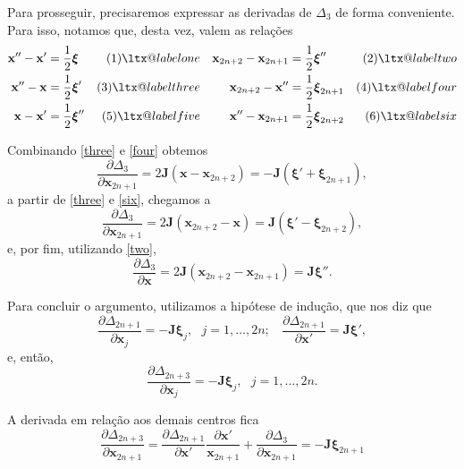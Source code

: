 \documentclass[
	12pt,
	oneside,			%
	a4paper,			%
	english,			%
	brazil				%
	]{abntex2}
\makeatletter
\theoremstyle{definition}
\newcommand\Label[1]{&\refstepcounter{equation}(\theequation)\ltx@label{#1}&}
\makeatother
\begin{document}
\begin{apendicesenv}
Para prosseguir, precisaremos expressar as derivadas de $\Delta_3$ de forma conveniente. Para isso, notamos que, desta vez, valem as relações
\begin{align*}
     \mathbf{x}'' - \mathbf{x}' &= \frac{1}{2}\boldsymbol{\xi} \Label{one}& \mathbf{x}_{2n+2} - \mathbf{x}_{2n+1} &= \frac{1}{2}\boldsymbol{\xi}'' \Label{two}\\
     \mathbf{x}'' - \mathbf{x} &= \frac{1}{2}\boldsymbol{\xi}' \Label{three}& \mathbf{x}_{2n+2} - \mathbf{x}'' &= \frac{1}{2}\boldsymbol{\xi}_{2n+1} \Label{four} \\
     \mathbf{x} - \mathbf{x}' &= \frac{1}{2}\boldsymbol{\xi}'' \Label{five}& \mathbf{x}'' - \mathbf{x}_{2n+1} &= \frac{1}{2}\boldsymbol{\xi}_{2n+2} \Label{six}
\end{align*}

Combinando \eqref{three} e \eqref{four} obtemos
\begin{equation}
    \frac{\partial \Delta_3}{\partial \mathbf{x}_{2n+1}} = 2\mathbf{J}\left(\mathbf{x}-\mathbf{x}_{2n+2}\right) = - \mathbf{J}\left( \boldsymbol{\xi}' + \boldsymbol{\xi}_{2n+1} \right),
\end{equation}
a partir de \eqref{three} e \eqref{six}, chegamos a
\begin{equation}
    \frac{\partial \Delta_3}{\partial \mathbf{x}_{2n+1}} = 2 \mathbf{J} \left(\mathbf{x}_{2n+2}-\mathbf{x}\right) = \mathbf{J}\left( \boldsymbol{\xi}' - \boldsymbol{\xi}_{2n+2} \right),
\end{equation}
e, por fim, utilizando \eqref{two},
\begin{equation}
    \frac{\partial \Delta_3}{\partial \mathbf{x}} = 2 \mathbf{J} \left(\mathbf{x}_{2n+2}-\mathbf{x}_{2n+1}\right) = \mathbf{J}\boldsymbol{\xi}''.
\end{equation}

Para concluir o argumento, utilizamos a hipótese de indução, que nos diz que
\begin{equation}
    \frac{\partial \Delta_{2n+1}}{\partial \mathbf{x}_j} = - \mathbf{J} \boldsymbol{\xi}_j, \ \ \ j = 1,\ldots,2n; \ \ \ \ \frac{\partial \Delta_{2n+1}}{\partial \mathbf{x}'} = \mathbf{J} \boldsymbol{\xi}',
\end{equation}
e, então,
\begin{equation}
    \frac{\partial \Delta_{2n+3}}{\partial \mathbf{x}_j} = - \mathbf{J} \boldsymbol{\xi}_j, \ \ \ j = 1,\ldots,2n.
\end{equation}

A derivada em relação aos demais centros fica
\begin{equation}
    \frac{\partial \Delta_{2n+3}}{\partial \mathbf{x}_{2n+1}} = \frac{\partial \Delta_{2n+1}}{\partial \mathbf{x}'} \frac{\partial \mathbf{x}'}{\mathbf{x}_{2n+1}} + \frac{\partial \Delta_3}{\partial \mathbf{x}_{2n+1}} =- \mathbf{J} \boldsymbol{\xi}_{2n+1}
\end{equation}


\end{apendicesenv}
\end{document}
